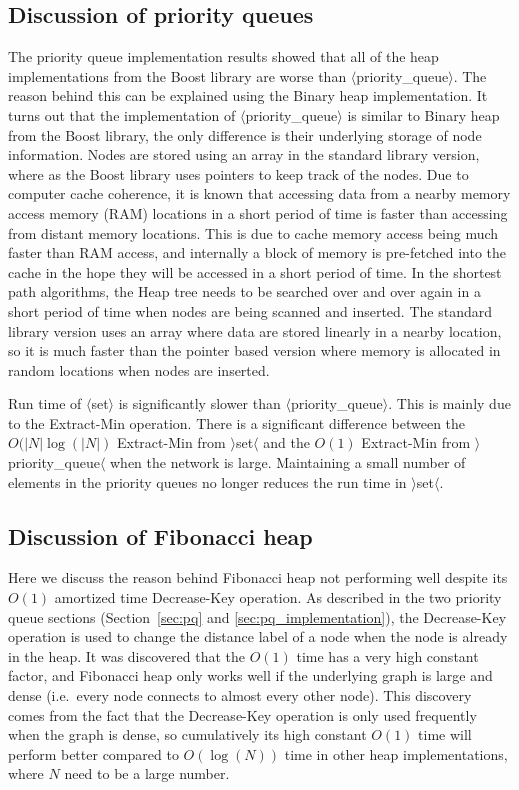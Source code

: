 \subsection{Discussion of priority queues}
The priority queue implementation results showed that
all of the heap implementations from the Boost library are worse than $\langle$priority\_queue$\rangle$.
The reason behind this can be explained using the Binary heap implementation.
It turns out that the implementation of $\langle$priority\_queue$\rangle$ is similar to Binary heap from the Boost library,
the only difference is their underlying storage of node information.
Nodes are stored using an array in the standard library version,
where as the Boost library uses pointers to keep track of 
the nodes.
Due to computer cache coherence,
it is known that accessing data from a nearby memory access memory (RAM) locations in a short period of time is faster than accessing from distant memory locations.
This is due to cache memory access being much faster than RAM access,
and internally a block of memory is pre-fetched into the cache in the hope they will be accessed in a short period of time.
In the shortest path algorithms,
the Heap tree needs to be searched over and over again in a short period of time when nodes are being scanned and inserted.
The standard library version uses an array where data are stored linearly in a nearby location,
so it is much faster than the pointer based version where memory is allocated in random locations when nodes are inserted.

Run time of $\langle$set$\rangle$ is significantly slower than $\langle$priority\_queue$\rangle$.
This is mainly due to the Extract-Min operation.
There is a significant difference between the $O(|N|\log(|N|)$ Extract-Min from $\rangle$set$\langle$ and the $O(1)$ Extract-Min from $\rangle$priority\_queue$\langle$ when the network is large.
Maintaining a small number of elements in the priority queues no longer reduces the run time in $\rangle$set$\langle$.

\subsection{Discussion of Fibonacci heap}
Here we discuss the reason behind Fibonacci heap not performing well despite its $O(1)$ amortized time Decrease-Key operation.
As described in the two priority queue sections (Section~\ref{sec:pq} and \ref{sec:pq_implementation}),
the Decrease-Key operation is used to change the distance label of a node when the node is already in the heap.
It was discovered that the $O(1)$ time has a very high constant factor,
and Fibonacci heap only works well if the underlying graph is large and dense (i.e.\ every node connects to almost every other node).
This discovery comes from the fact that 
the Decrease-Key operation is only used frequently when the graph is dense,
so cumulatively its high constant $O(1)$ time will perform better compared to $O(\log(N))$ time in other heap implementations, where $N$ need to be a large number.

